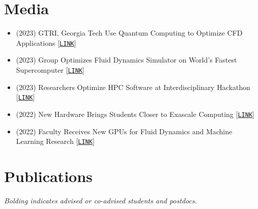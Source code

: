 \section{Media}

\begin{itemize}
    \item (2023) GTRI, Georgia Tech Use Quantum Computing to Optimize CFD Applications
 [\href{https://gtri.gatech.edu/newsroom/gtri-georgia-tech-use-quantum-computing-optimize-cfd-applications}{\tt LINK}]

    \item (2023) Group Optimizes Fluid Dynamics Simulator on World's Fastest Supercomputer [\href{https://www.cc.gatech.edu/news/group-optimizes-fluid-dynamics-simulator-worlds-fastest-supercomputer}{\tt LINK}]

    \item (2023) Researchers Optimize HPC Software at Interdisciplinary Hackathon
[\href{https://www.cc.gatech.edu/news/researchers-optimize-hpc-software-interdisciplinary-hackathon}{\tt LINK}]

    \item (2022) New Hardware Brings Students Closer to Exascale Computing [\href{https://www.cc.gatech.edu/news/new-hardware-brings-students-closer-exascale-computing}{\tt LINK}]

    \item (2022) Faculty Receives New GPUs for Fluid Dynamics and Machine Learning Research [\href{https://www.cc.gatech.edu/news/faculty-receives-new-gpus-fluid-dynamics-and-machine-learning-research}{\tt LINK}]
\end{itemize}

\section{Publications}

\begin{center}
    \textit{Bolding indicates advised or co-advised students and postdocs.}
\end{center}

\nocite{*}

\newrefcontext[labelprefix=U]
\printbibliography[type=unpublished,title={Preprints},resetnumbers=true,heading=subbibnumbered]

\newrefcontext[labelprefix=P]
\printbibliography[title={Archival, heavily refereed papers},resetnumbers=true,filter=fullpapers,heading=subbibnumbered]

\newrefcontext[labelprefix=C]
\printbibliography[title={Conference papers},resetnumbers=true,filter=nonheavy,heading=subbibnumbered]

